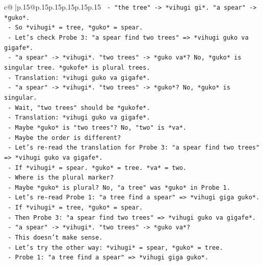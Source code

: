 \documentclass{article}
\begin{document}
{\begin{supertabular}{c@{$\;$}|p{.15\linewidth}@{}p{.15\linewidth}p{.15\linewidth}p{.15\linewidth}p{.15\linewidth}p{.15\linewidth}}
{{{\texttt{                  {-} "the tree" {-}> *vihugi gi*. "a spear" {-}> *guko*.} \\
\texttt{                  {-} So *vihugi* = tree, *guko* = spear.} \\
\texttt{                {-} Let's check Probe 3: "a spear find two trees" => *vihugi guko va gigafe*.} \\
\texttt{                  {-} "a spear" {-}> *vihugi*. "two trees" {-}> *guko va*? No, *guko* is singular tree. *gukofe* is plural trees.} \\
\texttt{                  {-} Translation: *vihugi guko va gigafe*.} \\
\texttt{                  {-} "a spear" {-}> *vihugi*. "two trees" {-}> *guko*? No, *guko* is singular.} \\
\texttt{                  {-} Wait, "two trees" should be *gukofe*.} \\
\texttt{                  {-} Translation: *vihugi guko va gigafe*.} \\
\texttt{                  {-} Maybe *guko* is "two trees"? No, "two" is *va*.} \\
\texttt{                  {-} Maybe the order is different?} \\
\texttt{                  {-} Let's re{-}read the translation for Probe 3: "a spear find two trees" => *vihugi guko va gigafe*.} \\
\texttt{                  {-} If *vihugi* = spear. *guko* = tree. *va* = two.} \\
\texttt{                  {-} Where is the plural marker?} \\
\texttt{                  {-} Maybe *guko* is plural? No, "a tree" was *guko* in Probe 1.} \\
\texttt{                  {-} Let's re{-}read Probe 1: "a tree find a spear" => *vihugi giga guko*.} \\
\texttt{                    {-} If *vihugi* = tree, *guko* = spear.} \\
\texttt{                    {-} Then Probe 3: "a spear find two trees" => *vihugi guko va gigafe*.} \\
\texttt{                    {-} "a spear" {-}> *vihugi*. "two trees" {-}> *guko va*?} \\
\texttt{                    {-} This doesn't make sense.} \\
\texttt{                  {-} Let's try the other way: *vihugi* = spear, *guko* = tree.} \\
\texttt{                    {-} Probe 1: "a tree find a spear" => *vihugi giga guko*.} \\
}}}
\end{supertabular}}
\end{document}
